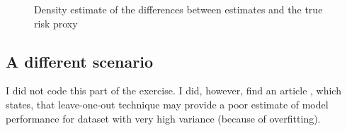 \documentclass{article}
\begin{document}
\begin{figure}[!h]
    \caption{Density estimate of the differences between estimates and the true risk proxy}
    \label{fig:cross-fold}
\end{figure}

\subsection{A different scenario}

I did not code this part of the exercise. I did, however, find an article \cite{kohavi1995relationship}, which states, that leave-one-out technique may provide a poor estimate of model performance for dataset with very high variance (because of overfitting).

\printbibliography
\end{document}
